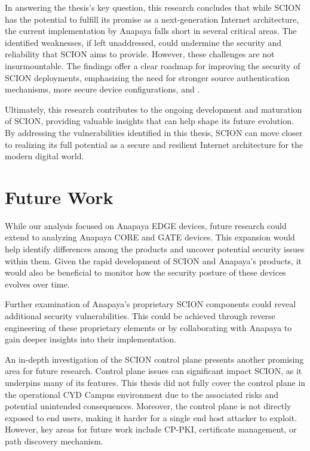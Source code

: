 In answering the thesis's key question, this research concludes that while SCION has the potential to fulfill its promise as a next-generation Internet architecture, the current implementation by Anapaya falls short in several critical areas.
The identified weaknesses, if left unaddressed, could undermine the security and reliability that SCION aims to provide.
However, these challenges are not insurmountable.
The findings offer a clear roadmap for improving the security of SCION deployments, emphasizing the need for stronger source authentication mechanisms, more secure device configurations, and .

Ultimately, this research contributes to the ongoing development and maturation of SCION, providing valuable insights that can help shape its future evolution.
By addressing the vulnerabilities identified in this thesis, SCION can move closer to realizing its full potential as a secure and resilient Internet architecture for the modern digital world.


\section{Future Work}

While our analysis focused on Anapaya EDGE devices, future research could extend to analyzing Anapaya CORE and GATE devices.
This expansion would help identify differences among the products and uncover potential security issues within them.
Given the rapid development of SCION and Anapaya's products, it would also be beneficial to monitor how the security posture of these devices evolves over time.

Further examination of Anapaya's proprietary SCION components could reveal additional security vulnerabilities.
This could be achieved through reverse engineering of these proprietary elements or by collaborating with Anapaya to gain deeper insights into their implementation.

An in-depth investigation of the SCION control plane presents another promising area for future research.
Control plane issues can significant impact SCION, as it underpins many of its features.
This thesis did not fully cover the control plane in the operational CYD Campus environment due to the associated risks and potential unintended consequences.
Moreover, the control plane is not directly exposed to end users, making it harder for a single end host attacker to exploit.
However, key areas for future work include CP-PKI, certificate management, or path discovery mechanism.

